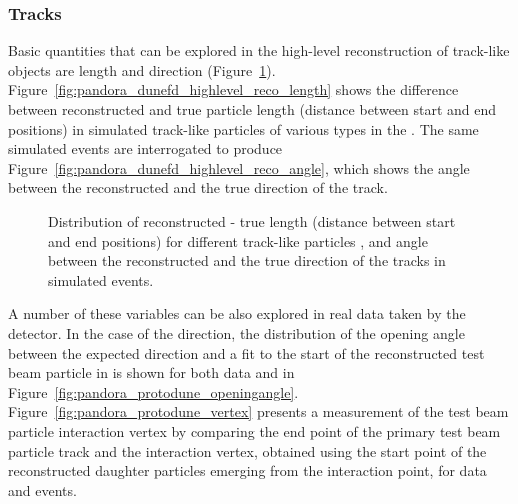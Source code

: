\subsubsection{Tracks}
\label{sec:Pandora:High:Tracks}

Basic quantities that can be explored in the high-level reconstruction of track-like objects are length and direction (Figure~\ref{fig:pandora_dunefd_highlevel_reco}). Figure~\ref{fig:pandora_dunefd_highlevel_reco_length} shows the difference between reconstructed and true particle length (\threed distance between start and end positions) in simulated track-like particles of various types in the . The same  simulated events are interrogated to produce Figure~\ref{fig:pandora_dunefd_highlevel_reco_angle}, which shows the angle between the reconstructed and the true \threed direction of the track.   

\begin{figure}[!ht]
\centering
{}
\caption[Distribution of reconstructed-true length for different track-like particles]{Distribution of reconstructed - true length (\threed distance between start and end positions) for different track-like particles \protect{}, and angle between the reconstructed and the true \threed direction of the tracks \protect{} in simulated  events.}
\label{fig:pandora_dunefd_highlevel_reco}
\end{figure}

A number of these variables can be also explored in real data taken by the  detector. In the case of the direction, the distribution of the opening angle between the expected direction and a fit to the start of the reconstructed test beam particle in  is shown for both data and  in Figure~\ref{fig:pandora_protodune_openingangle}.    Figure~\ref{fig:pandora_protodune_vertex} presents a measurement of the test beam particle interaction vertex by comparing the end point of the primary test beam particle track and the interaction vertex, obtained using the start point of the reconstructed daughter particles emerging from the interaction point, for  data and  events. 

